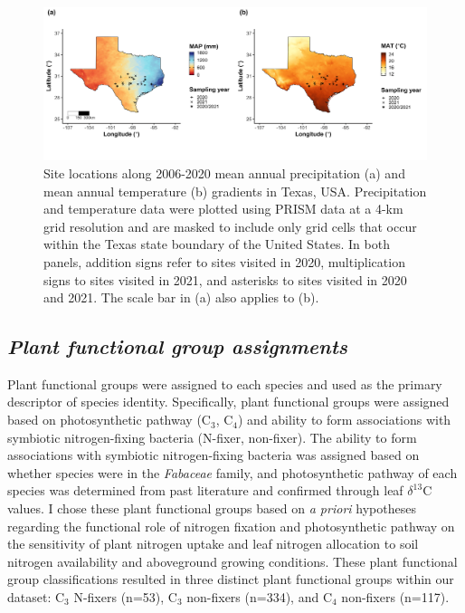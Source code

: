 \newpage
\begin{landscape}
    \begin{figure}
        \centering
        \includegraphics[width=\columnwidth]{ch4_TXeco/figs/TXeco_fig1_site_map.jpg}
        \caption[Site locations along 2006-2020 mean annual precipitation and mean annual temperature gradients in Texas, USA.]{Site locations along 2006-2020 mean annual precipitation (a) and mean annual temperature (b) gradients in Texas, USA. Precipitation and temperature data were plotted using PRISM data at a 4-km grid resolution and are masked to include only grid cells that occur within the Texas state boundary of the United States. In both panels, addition signs refer to sites visited in 2020, multiplication signs to sites visited in 2021, and asterisks to sites visited in 2020 and 2021. The scale bar in (a) also applies to (b).}
        \label{fig:figure4.1}
    \end{figure}
\end{landscape}
\clearpage

\subsection{\textit{Plant functional group assignments}}
\noindent Plant functional groups were assigned to each species and used as the primary descriptor of species identity. Specifically, plant functional groups were assigned based on photosynthetic pathway (C$_3$, C$_4$) and ability to form associations with symbiotic nitrogen-fixing bacteria (N-fixer, non-fixer). The ability to form associations with symbiotic nitrogen-fixing bacteria was assigned based on whether species were in the \textit{Fabaceae} family, and photosynthetic pathway of each species was determined from past literature and confirmed through leaf $\delta^{13}$C values. I chose these plant functional groups based on \textit{a priori} hypotheses regarding the functional role of nitrogen fixation and photosynthetic pathway on the sensitivity of plant nitrogen uptake and leaf nitrogen allocation to soil nitrogen availability and aboveground growing conditions. These plant functional group classifications resulted in three distinct plant functional groups within our dataset: C$_3$ N-fixers (n=53), C$_3$ non-fixers (n=334), and C$_4$ non-fixers (n=117).

